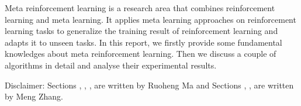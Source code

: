 Meta reinforcement learning is a research area that combines reinforcement learning and meta learning. It applies meta learning approaches on reinforcement learning tasks to generalize the training result of reinforcement learning and adapts it to unseen tasks. In this report, we firstly provide some fundamental knowledges about meta reinforcement learning. Then we discuss a couple of algorithms in detail and analyse their experimental results.\par
Disclaimer: {\normalfont Sections , , ,  are written by Ruoheng Ma and Sections , ,  are written by Meng Zhang.}